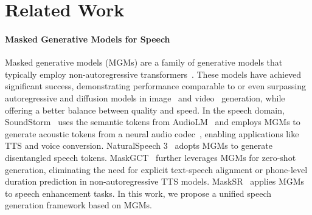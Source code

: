 \section{Related Work}
\paragraph{Masked Generative Models for Speech} Masked generative models (MGMs) are a family of generative models that typically employ non-autoregressive transformers~\cite{vaswani2017attention}. These models have achieved significant success, demonstrating performance comparable to or even surpassing autoregressive and diffusion models in image~\cite{chang2022maskgit, chang2023muse, xie2024show} and video~\cite{yu2023magvit, yu2023language} generation, while offering a better balance between quality and speed.
In the speech domain, SoundStorm~\cite{borsos2023soundstorm} uses the semantic tokens from AudioLM~\cite{borsos2023audiolm} and employs MGMs to generate acoustic tokens from a neural audio codec~\cite{zeghidour2021soundstream}, enabling applications like TTS and voice conversion. NaturalSpeech 3~\cite{ju2024naturalspeech} adopts MGMs to generate disentangled speech tokens. MaskGCT~\cite{wang2024maskgct} further leverages MGMs for zero-shot generation, eliminating the need for explicit text-speech alignment or phone-level duration prediction in non-autoregressive TTS models. MaskSR~\cite{li2024masksr} applies MGMs to speech enhancement tasks. In this work, we propose a unified speech generation framework based on MGMs.


